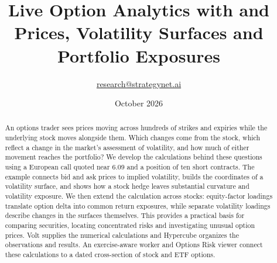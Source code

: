 \documentclass[8pt]{strategynet-journal}
\title{Live Option Analytics with \VOLT{} and \HYPER{}\\
\large Prices, Volatility Surfaces and Portfolio Exposures}
\author{\href{mailto:research@strategynet.ai}{research@strategynet.ai}}
\date{October 2026}
\begin{document}
\maketitle
\begin{abstract}
\normalsize An options trader sees prices moving across hundreds of strikes and expiries while the underlying stock moves alongside them. Which changes come from the stock, which reflect a change in the market's assessment of volatility, and how much of either movement reaches the portfolio? We develop the calculations behind these questions using a European call quoted near 6.09 and a position of ten short contracts. The example connects bid and ask prices to implied volatility, builds the coordinates of a volatility surface, and shows how a stock hedge leaves substantial curvature and volatility exposure. We then extend the calculation across stocks: equity-factor loadings translate option delta into common return exposures, while separate volatility loadings describe changes in the surfaces themselves. This provides a practical basis for comparing securities, locating concentrated risks and investigating unusual option prices. Volt supplies the numerical calculations and Hypercube organizes the observations and results. An exercise-aware worker and Options Risk viewer connect these calculations to a dated cross-section of stock and ETF options.
\end{abstract}
\SNtwocolumntableofcontents
\end{document}
